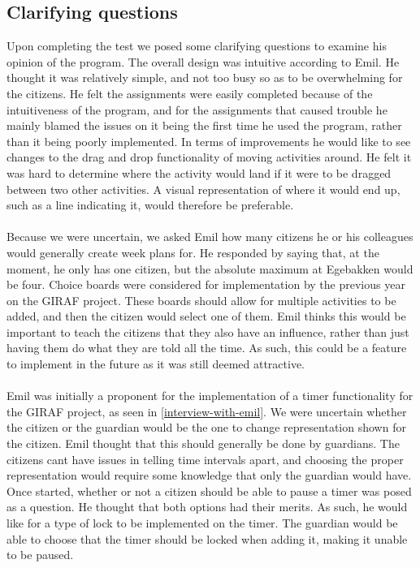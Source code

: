 \subsection{Clarifying questions}
Upon completing the test we posed some clarifying questions to examine his opinion of the program.
The overall design was intuitive according to Emil. He thought it was relatively simple, and not too busy so as to be overwhelming for the citizens.
He felt the assignments were easily completed because of the intuitiveness of the program, and for the assignments that caused trouble he mainly blamed the issues on it being the first time he used the program, rather than it being poorly implemented.
In terms of improvements he would like to see changes to the drag and drop functionality of moving activities around.
He felt it was hard to determine where the activity would land if it were to be dragged between two other activities.
A visual representation of where it would end up, such as a line indicating it, would therefore be preferable.
\\\\
Because we were uncertain, we asked Emil how many citizens he or his colleagues would generally create week plans for.
He responded by saying that, at the moment, he only has one citizen, but the absolute maximum at Egebakken would be four.
Choice boards were considered for implementation by the previous year on the GIRAF project.
These boards should allow for multiple activities to be added, and then the citizen would select one of them.
Emil thinks this would be important to teach the citizens that they also have an influence, rather than just having them do what they are told all the time.
As such, this could be a feature to implement in the future as it was still deemed attractive.
\\\\
Emil was initially a proponent for the implementation of a timer functionality for the GIRAF project, as seen in \autoref{interview-with-emil}.
We were uncertain whether the citizen or the guardian would be the one to change representation shown for the citizen.
Emil thought that this should generally be done by guardians.
The citizens cant have issues in telling time intervals apart, and choosing the proper representation would require some knowledge that only the guardian would have.
Once started, whether or not a citizen should be able to pause a timer was posed as a question.
He thought that both options had their merits. 
As such, he would like for a type of lock to be implemented on the timer.
The guardian would be able to choose that the timer should be locked when adding it, making it unable to be paused.

